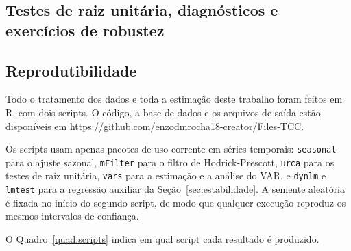\documentclass[12pt,openright,oneside,a4paper,portuguese,brazil]{abntex2}
\begin{document}
\cleardoublepage
{}




\begin{apendicesenv}

\chapter{Testes de raiz unitária, diagnósticos e exercícios de robustez}
\label{ape:robustez}
\justifying

\section{Reprodutibilidade}
\label{sec:reprodutibilidade}

Todo o tratamento dos dados e toda a estimação deste trabalho foram feitos em
R, com dois scripts. O código, a base de dados e os arquivos de saída estão disponíveis em \url{https://github.com/enzodmrocha18-creator/Files-TCC}.

Os scripts usam apenas pacotes de uso corrente em séries temporais:
\texttt{seasonal} para o ajuste sazonal, \texttt{mFilter} para o filtro de
Hodrick-Prescott, \texttt{urca} para os testes de raiz unitária, \texttt{vars}
para a estimação e a análise do VAR, e \texttt{dynlm} e \texttt{lmtest} para a
regressão auxiliar da Seção~\ref{sec:estabilidade}. A semente aleatória é
fixada no início do segundo script, de modo que qualquer execução reproduz os
mesmos intervalos de confiança.

O Quadro~\ref{quad:scripts} indica em qual script cada resultado é produzido.


\end{apendicesenv}
\end{document}
